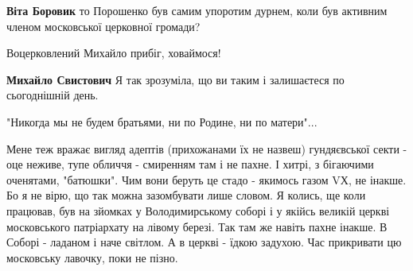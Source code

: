 \begin{itemize}
\begin{itemize}
 
\textbf{Віта Боровик} то Порошенко був самим упоротим дурнем, коли був активним членом московської церковної громади?

 
Воцерковлений Михайло прибіг, ховаймося!

 
\textbf{Михайло Свистович} Я так зрозуміла, що ви таким і залишаєтеся по сьогоднішній день.
\end{itemize}

 
"Никогда мы не будем братьями, ни по Родине, ни по матери"...

 

Мене теж вражає вигляд адептів (прихожанами їх не назвеш) гундяєвської секти -
оце неживе, тупе обличчя - смиренням там і не пахне. І хитрі, з бігаючими
оченятами, "батюшки". Чим вони беруть це стадо - якимось газом VХ, не інакше.
Бо я не вірю, що так можна зазомбувати лише словом. Я колись, ще коли працював,
був на зйомках у Володимирському соборі і у якійсь великій церкві московського
патріархату на лівому березі. Так там же навіть пахне інакше. В Соборі -
ладаном і наче світлом. А в церкві - їдкою задухою. Час прикривати цю
московську лавочку, поки не пізно.


\end{itemize}
